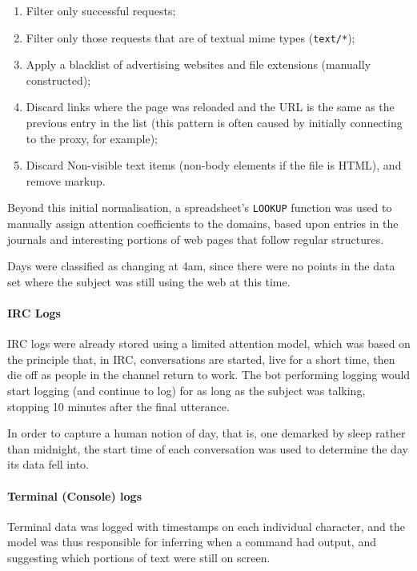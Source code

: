 \begin{enumerate}
    \item Filter only successful requests;
    \item Filter only those requests that are of textual mime types (\texttt{text/*});
    \item Apply a blacklist of advertising websites and file extensions (manually constructed);
    \item Discard links where the page was reloaded and the URL is the same as the previous entry in the list (this pattern is often caused by initially connecting to the proxy, for example);
    \item Discard Non-visible text items (non-body elements if the file is HTML), and remove markup.
\end{enumerate}

Beyond this initial normalisation, a spreadsheet's \texttt{LOOKUP} function was used to manually assign attention coefficients to the domains, based upon entries in the journals and interesting portions of web pages that follow regular structures.

Days were classified as changing at 4am, since there were no points in the data set where the subject was still using the web at this time.



\paragraph{IRC Logs}
IRC logs were already stored using a limited attention model, which was based on the principle that, in IRC, conversations are started, live for a short time, then die off as people in the channel return to work.  The bot performing logging would start logging (and continue to log) for as long as the subject was talking, stopping 10 minutes after the final utterance.

In order to capture a human notion of day, that is, one demarked by sleep rather than midnight, the start time of each conversation was used to determine the day its data fell into.



\paragraph{Terminal (Console) logs}
Terminal data was logged with timestamps on each individual character, and the model was thus responsible for inferring when a command had output, and suggesting which portions of text were still on screen.

